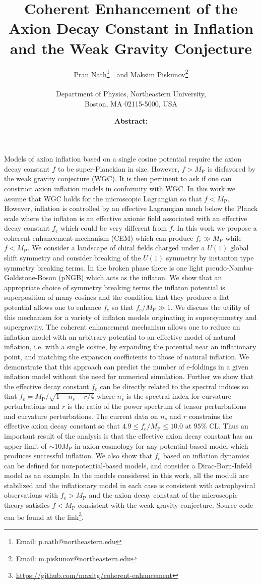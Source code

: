 \documentclass[11pt]{article}
\author{
  Pran Nath\footnote{Email: p.nath@northeastern.edu}~\ and
  Maksim Piskunov\footnote{Email: m.piskunov@northeastern.edu}\\~\\
  Department of Physics, Northeastern University,\\
  Boston, MA 02115-5000, USA
}
\title{
  Coherent Enhancement of the Axion Decay Constant in Inflation and the Weak Gravity Conjecture
}
\begin{document}
\maketitle
\date

\textbf{Abstract:}
Models of axion inflation based on a single cosine potential require the axion decay constant $f$ to be super-Planckian in size.
However, $f > M_\text{P}$ is disfavored by the weak gravity conjecture (WGC).
It is then pertinent to ask if one can construct axion inflation models in conformity with WGC.
In this work we assume that WGC holds for the microscopic Lagrangian so that $f < M_\text{P}$.
However, inflation is controlled by an effective Lagrangian much below the Planck scale where the inflaton is an effective axionic field associated with an effective decay constant $f_e$ which could be very different from $f$.
In this work we propose a coherent enhancement mechanism (CEM) which can produce $f_e \gg M_\text{P}$ while $f < M_\text{P}$.
We consider a landscape of chiral fields charged under a $U\left(1\right)$ global shift symmetry and consider breaking of the $U\left(1\right)$ symmetry by instanton type symmetry breaking terms.
In the broken phase there is one light pseudo-Nambu-Goldstone-Boson (pNGB) which acts as the inflaton.
We show that an appropriate choice of symmetry breaking terms the inflaton potential is superposition of many cosines and the condition that they produce a flat potential allows one to enhance $f_e$ so that $f_e / M_\text{P} \gg 1$.
We discuss the utility of this mechanism for a variety of inflaton models originating in supersymmetry and supergravity.
The coherent enhancement mechanism allows one to reduce an inflation model with an arbitrary potential to an effective model of natural inflation, i.e. with a single cosine, by expanding the potential near an inflationary point, and matching the expansion coefficients to those of natural inflation.
We demonstrate that this approach can predict the number of e-foldings in a given inflation model without the need for numerical simulation.
Further we show that the effective decay constant $f_e$ can be directly related to the spectral indices so that $f_e = M_\text{P} / \sqrt{1 - n_s - r / 4}$ where $n_s$ is the spectral index for curvature perturbations and $r$ is the ratio of the power spectrum of tensor perturbations and curvature perturbations.
The current data on $n_s$ and $r$ constrains the effective axion decay constant so that $4.9 \leq f_e / M_\text{P} \leq 10.0$ at $95\%$ CL.
Thus an important result of the analysis is that the effective axion decay constant has an upper limit of $\sim 10 M_\text{P}$ in axion cosmology for any potential-based model which produces successful inflation.
We also show that $f_e$ based on inflation dynamics can be defined for non-potential-based models, and consider a Dirac-Born-Infeld model as an example.
In the models considered in this work, all the moduli are stabilized and the inflationary model in each case is consistent with astrophysical observations with $f_e > M_\text{P}$ and the axion decay constant of the microscopic theory satisfies $f < M_\text{P}$ consistent with the weak gravity conjecture.
Source code can be found at the link\footnote{\url{https://github.com/maxitg/coherent-enhancement}}.
\newpage
\end{document}
